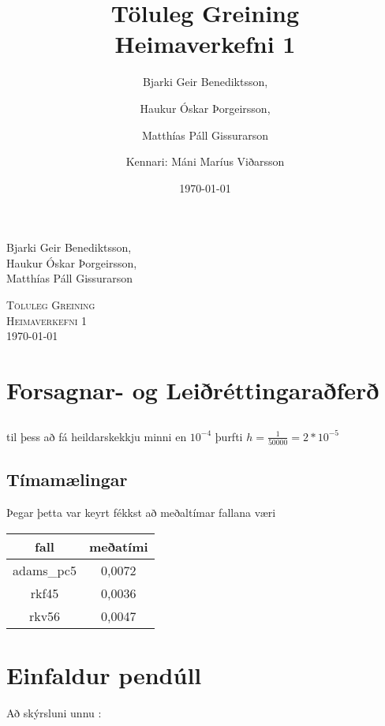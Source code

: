 \documentclass[a4]{article}
\title{Töluleg Greining\\ Heimaverkefni 1}
\date{\today{}}
\author{ 
  Bjarki Geir Benediktsson,\and
  Haukur Óskar Þorgeirsson,\and
  Matthías Páll Gissurarson \and
  Kennari: Máni Maríus Viðarsson
  }
\begin{document}
\begin{flushright}
  Bjarki Geir Benediktsson,\\
  Haukur Óskar Þorgeirsson,\\
  Matthías Páll Gissurarson\\
\end{flushright}

\begin{center}
 \textsc{ \LARGE Töluleg Greining\\
  Heimaverkefni 1\\
  \today{}
  }
  \end{center}
\vfill

\maketitle
\section{Forsagnar- og Leiðréttingaraðferð}
\subsection{}

\subsection{}
\subsection{}
til þess að fá heildarskekkju minni en $10^{-4}$ þurfti $h=\frac{1}{50000}=2*10^{-5}$

\subsection{Tímamælingar}

Þegar þetta var keyrt fékkst að meðaltímar fallana væri
\begin{tabular}{|c|c|}
\hline
fall		&meðatími \\\hline
adams\_pc5	&0,0072\\\hline
rkf45		&0,0036\\\hline
rkv56		&0,0047\\\hline
\end{tabular}


\section{Einfaldur pendúll}

\vspace{20 mm}
Að skýrsluni unnu :
\hspace{0.5cm} \makebox[1.5in]{\hrulefill}
\hspace{0.5cm} \makebox[1.5in]{\hrulefill}
\hspace{0.5cm} \makebox[1.5in]{\hrulefill}
\end{document}
